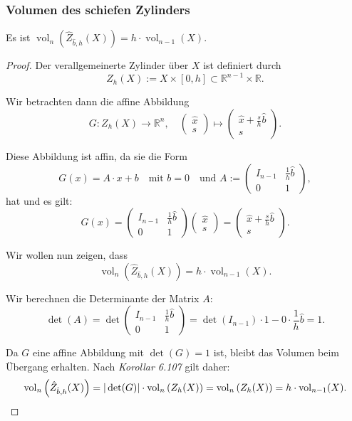 \documentclass{article}
\begin{document}
\newpage

\subsubsection*{Volumen des schiefen Zylinders}

Es ist $\operatorname{vol}_n \left( \hat{Z}_{\hat{b}, h}(X) \right) = h \cdot \operatorname{vol}_{n-1}(X)$.

\begin{proof}
  Der verallgemeinerte Zylinder über \( X \) ist definiert durch
  \[
    Z_h(X) := X \times [0, h] \subset \mathbb{R}^{n-1} \times \mathbb{R}.
  \]

  Wir betrachten dann die affine Abbildung
  \[
    G : Z_h(X) \rightarrow \mathbb{R}^n, \quad \begin{pmatrix} \hat{x} \\ s \end{pmatrix} \mapsto \begin{pmatrix} \hat{x} + \frac{s}{h} \hat{b} \\ s \end{pmatrix}.
  \]

  Diese Abbildung ist affin, da sie die Form
  \[
    G(x) = A \cdot x + b
    \quad \text{mit } b = 0
    \quad \text{und }  A := \begin{pmatrix}
      I_{n-1} & \frac{1}{h} \hat{b} \\
      0       & 1
    \end{pmatrix},
  \]
  hat und es gilt:
  \[
    G(x) =
    \begin{pmatrix}
      I_{n-1} & \frac{1}{h} \hat{b} \\
      0       & 1
    \end{pmatrix}
    \begin{pmatrix} \hat{x} \\ s \end{pmatrix} =
    \begin{pmatrix} \hat{x} + \frac{s}{h} \hat{b} \\ s \end{pmatrix}.
  \]

  Wir wollen nun zeigen, dass
  \[
    \operatorname{vol}_n \left( \hat{Z}_{\hat{b}, h}(X) \right) = h \cdot \operatorname{vol}_{n-1}(X).
  \]

  Wir berechnen die Determinante der Matrix \( A \):
  \[
    \det(A) = \det \begin{pmatrix} I_{n-1} & \frac{1}{h} \hat{b} \\ 0 & 1 \end{pmatrix}
    = \det(I_{n-1}) \cdot 1 - 0 \cdot \frac{1}{h} \hat{b} = 1.
  \]

  Da \( G \) eine affine Abbildung mit \( \det(G) = 1 \) ist, bleibt das Volumen beim Übergang erhalten.
  Nach \textit{Korollar 6.107} gilt daher:
  \[
    \operatorname{vol}_n \left( \hat{Z}_{\hat{b}, h}(X) \right) = |\det(G)| \cdot \operatorname{vol}_n \left( Z_h(X) \right)
    =  \operatorname{vol}_n \left( Z_h(X) \right) = h \cdot \operatorname{vol}_{n-1}(X).
    \qedhere
  \]

\end{proof}
\end{document}
